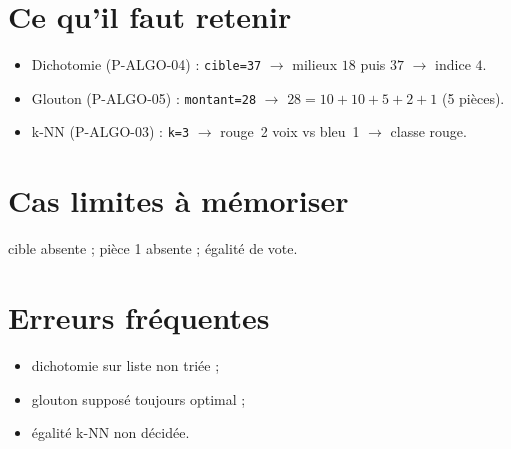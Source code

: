 \documentclass[a4paper,11pt]{article}
\begin{document}

\section*{Ce qu'il faut retenir}
\begin{itemize}[nosep]
  \item Dichotomie (P-ALGO-04) : \texttt{cible=37} $\rightarrow$ milieux $18$ puis $37$ $\rightarrow$ indice $4$.
  \item Glouton (P-ALGO-05) : \texttt{montant=28} $\rightarrow$ $28 = 10+10+5+2+1$ (5 pièces).
  \item k-NN (P-ALGO-03) : \texttt{k=3} $\rightarrow$ rouge~2 voix vs bleu~1 $\rightarrow$ classe rouge.
\end{itemize}

\section*{Cas limites à mémoriser}
cible absente ; pièce 1 absente ; égalité de vote.

\section*{Erreurs fréquentes}
\begin{itemize}[nosep]
  \item dichotomie sur liste non triée ;
  \item glouton supposé toujours optimal ;
  \item égalité k-NN non décidée.
\end{itemize}
\end{document}
